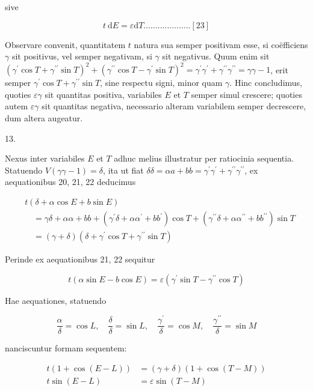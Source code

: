\documentclass[10pt]{article}
\begin{document}
sive

\[
t \mathrm{~d} E=\varepsilon \mathrm{d} T \ldots \ldots . . . . . . . . . . . . . .[23]
\]

Observare convenit, quantitatem \(t\) natura sua semper positivam esse, si coëfficiens \(\gamma\) sit positivus, vel semper negativam, si \(\gamma\) sit negativus. Quum enim sit \(\left(\gamma^{\prime} \cos T+\gamma^{\prime \prime} \sin T\right)^{2}+\left(\gamma^{\prime \prime} \cos T-\gamma^{\prime} \sin T\right)^{2}=\gamma^{\prime} \gamma^{\prime}+\gamma^{\prime \prime} \gamma^{\prime \prime}=\gamma \gamma-1\), erit semper
\(\gamma^{\prime} \cos T+\gamma^{\prime \prime} \sin T\), sine respectu signi, minor quam \(\gamma\). Hinc concludimus, quoties \(\varepsilon \gamma\) sit quantitas positiva, variabiles \(E\) et \(T\) semper simul crescere; quoties autem \(\varepsilon \gamma\) sit quantitas negativa, necessario alteram variabilem semper decrescere, dum altera augeatur.

13.

Nexus inter variabiles \(E\) et \(T\) adhuc melius illustratur per ratiocinia sequentia. Statuendo \(V(\gamma \gamma-1)=\delta\), ita ut fiat \(\delta \delta=\alpha a+b b=\gamma^{\prime} \gamma^{\prime}+\gamma^{\prime \prime} \gamma^{\prime \prime}\), ex aequationibus 20, 21, 22 deducimus

\[
\begin{aligned}
& t(\delta+\alpha \cos E+b \sin E) \\
& \quad=\gamma \delta+\alpha \alpha+b b+\left(\gamma^{\prime} \delta+\alpha \alpha^{\prime}+b b^{\prime}\right) \cos T+\left(\gamma^{\prime \prime} \delta+\alpha \alpha^{\prime \prime}+b b^{\prime \prime}\right) \sin T \\
& \quad=(\gamma+\delta)\left(\delta+\gamma^{\prime} \cos T+\gamma^{\prime \prime} \sin T\right)
\end{aligned}
\]

Perinde ex aequationibus 21, 22 sequitur

\[
t(\alpha \sin E-b \cos E)=\varepsilon\left(\gamma^{\prime} \sin T-\gamma^{\prime \prime} \cos T\right)
\]

Hae aequationes, statuendo

\[
\frac{\alpha}{\delta}=\cos L, \quad \frac{\delta}{\delta}=\sin L, \quad \frac{\gamma^{\prime}}{\delta}=\cos M, \quad \frac{\gamma^{\prime \prime}}{\delta}=\sin M
\]

nanciscuntur formam sequentem:

\[
\begin{aligned}
t(1+\cos (E-L)) & =(\gamma+\delta)(1+\cos (T-M)) \\
t \sin (E-L) & =\varepsilon \sin (T-M)
\end{aligned}
\]
\end{document}
